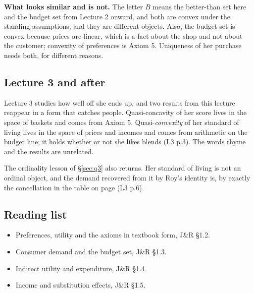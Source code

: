 \documentclass[11pt,letterpaper]{article}
\theoremstyle{definition}
\theoremstyle{plain}
\newcommand{\src}[1]{{\small\textsf{(#1)}}}
\begin{document}
\textbf{What looks similar and is not.} The letter $B$ means the better-than set here and the budget
set from Lecture 2 onward, and both are convex under the standing assumptions, and they are different
objects. Also, the budget set is convex because prices are linear, which is a fact about the shop and
not about the customer; convexity of preferences is Axiom 5. Uniqueness of her purchase needs both,
for different reasons.

\subsection{Lecture 3 and after}

Lecture 3 studies how well off she ends up, and two results from this lecture reappear in a form that
catches people. Quasi-concavity of her score lives in the space of baskets and comes from Axiom 5.
Quasi-\emph{convexity} of her standard of living lives in the space of prices and incomes and comes
from arithmetic on the budget line; it holds whether or not she likes blends \src{L3 p.3}. The words
rhyme and the results are unrelated.

The ordinality lesson of \S\ref{sec:q3} also returns. Her standard of living is not an ordinal
object, and the demand recovered from it by Roy's identity is, by exactly the cancellation in the
table on page \pageref{sec:q3} \src{L3 p.6}.

\subsection{Reading list}

\begin{itemize}
\item Preferences, utility and the axioms in textbook form, J\&R \S1.2.
\item Consumer demand and the budget set, J\&R \S1.3.
\item Indirect utility and expenditure, J\&R \S1.4.
\item Income and substitution effects, J\&R \S1.5.
\end{itemize}
\end{document}
